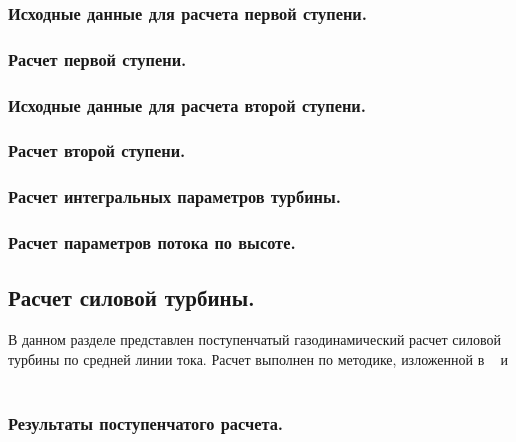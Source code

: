 \documentclass[a4paper,12pt]{article}
\begin{document}
    \subsubsection{Исходные данные для расчета первой ступени.}
    \subsubsection{Расчет первой ступени.}
    \subsubsection{Исходные данные для расчета второй ступени.}
    \subsubsection{Расчет второй ступени.}
    \subsubsection{Расчет интегральных параметров турбины.}
    \subsubsection{Расчет параметров потока по высоте.}

    \subsection{Расчет силовой турбины.}
    В данном разделе представлен поступенчатый газодинамический расчет силовой турбины по средней линии тока.
    Расчет выполнен по методике, изложенной в ~\cite{molyakov1} и ~\cite{molyakov2}
    \subsubsection{Результаты поступенчатого расчета.}
\end{document}
